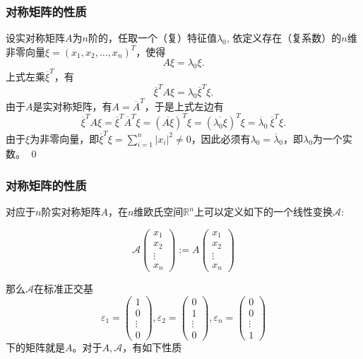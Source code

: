 
\begin{frame}
\frametitle{对称矩阵的性质}

\startproof[bg=yellow, fg=red]
设实对称矩阵$A$为$n$阶的，任取一个（复）特征值$\lambda_0$, 依定义存在（复系数）的$n$维非零向量$\xi = (x_1,x_2,\ldots,x_n)^T$，使得
\[A\xi = \lambda_0\xi.\]
上式左乘$\overline{\xi}^T$，有
\[\overline{\xi}^TA\xi = \lambda_0 \overline{\xi}^T\xi.\]
由于$A$是实对称矩阵，有$A = \overline{A}^T$，于是上式左边有
\[\overline{\xi}^TA\xi = \overline{\xi}^T\overline{A}^T\xi = (\overline{A\xi})^T\xi = (\overline{\lambda_0\xi})^T\xi = \overline{\lambda}_0 ~ \overline{\xi}^T\xi.\]
由于$\xi$为非零向量，即$\displaystyle \overline{\xi}^T\xi = \sum\limits_{i=1}^n \lvert x_i \rvert^2 \neq 0$，因此必须有$\lambda_0 = \overline{\lambda}_0$，即$\lambda_0$为一个实数。
\qed

\end{frame}


\begin{frame}
\frametitle{对称矩阵的性质}

对应于$n$阶实对称矩阵$A$，在$n$维欧氏空间$\mathbb{R}^n$上可以定义如下的一个线性变换$\mathscr{A}$:

\[\mathscr{A} \begin{pmatrix} x_1 \\ x_2 \\ \vdots \\ x_n \end{pmatrix} := A \begin{pmatrix} x_1 \\ x_2 \\ \vdots \\ x_n \end{pmatrix}\]

\pause

那么$\mathscr{A}$在标准正交基
\[\varepsilon_1 = \begin{pmatrix} 1 \\ 0 \\ \vdots \\ 0 \end{pmatrix}, \varepsilon_2 = \begin{pmatrix} 0 \\ 1 \\ \vdots \\ 0 \end{pmatrix}, \varepsilon_n = \begin{pmatrix} 0 \\ 0 \\ \vdots \\ 1 \end{pmatrix}\]
下的矩阵就是$A$。对于$A, \mathscr{A}$，有如下性质

\end{frame}

